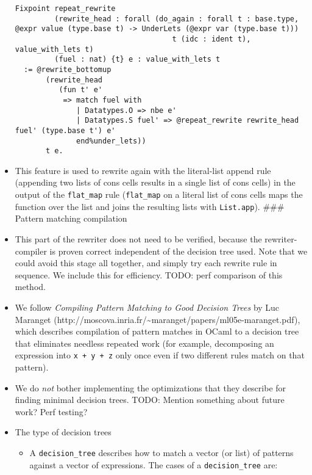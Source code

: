 \begin{itemize}
\begin{verbatim}
Fixpoint repeat_rewrite
         (rewrite_head : forall (do_again : forall t : base.type, @expr value (type.base t) -> UnderLets (@expr var (type.base t)))
                                    t (idc : ident t), value_with_lets t)
         (fuel : nat) {t} e : value_with_lets t
  := @rewrite_bottomup
       (rewrite_head
          (fun t' e'
           => match fuel with
              | Datatypes.O => nbe e'
              | Datatypes.S fuel' => @repeat_rewrite rewrite_head fuel' (type.base t') e'
              end%under_lets))
       t e.
\end{verbatim}
\item
  This feature is used to rewrite again with the literal-list append
  rule (appending two lists of cons cells results in a single list of
  cons cells) in the output of the \texttt{flat\_map} rule
  (\texttt{flat\_map} on a literal list of cons cells maps the function
  over the list and joins the resulting lists with \texttt{List.app}).
  \#\#\# Pattern matching compilation
\item
  This part of the rewriter does not need to be verified, because the
  rewriter-compiler is proven correct independent of the decision tree
  used. Note that we could avoid this stage all together, and simply try
  each rewrite rule in sequence. We include this for efficiency. TODO:
  perf comparison of this method.
\item
  We follow \emph{Compiling Pattern Matching to Good Decision Trees} by
  Luc Maranget
  (http://moscova.inria.fr/\textasciitilde maranget/papers/ml05e-maranget.pdf),
  which describes compilation of pattern matches in OCaml to a decision
  tree that eliminates needless repeated work (for example, decomposing
  an expression into \texttt{x\ +\ y\ +\ z} only once even if two
  different rules match on that pattern).
\item
  We do \emph{not} bother implementing the optimizations that they
  describe for finding minimal decision trees. TODO: Mention something
  about future work? Perf testing?
\item
  The type of decision trees

  \begin{itemize}
  \item
    A \texttt{decision\_tree} describes how to match a vector (or list)
    of patterns against a vector of expressions. The cases of a
    \texttt{decision\_tree} are:


\end{itemize}
\end{itemize}
